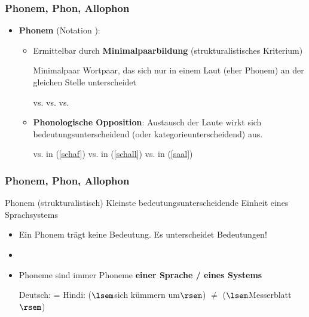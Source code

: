 \begin{frame}
\frametitle{Phonem, Phon, Allophon}

\begin{itemize}
	\item \textbf{Phonem} (Notation \textipa{/ /}):
	
	\begin{itemize}
		\item Ermittelbar durch \textbf{Minimalpaarbildung} (strukturalistisches Kriterium)
		
		\begin{block}{Minimalpaar}
Wortpaar, das sich nur in einem Laut (eher Phonem) an der gleichen Stelle unterscheidet
		\end{block}
	
	\eal
		\ex \label{schaf} \textipa{[Sa:l]}   vs. \textipa{[Sa:f]} 
		\ex\label{schall} \textipa{[Sa:l]}  vs. \textipa{[Sal]} 
		\ex \label{saal} \textipa{[Sa:l]}  vs. \textipa{[za:l]} 
	\zl
	
		\item \textbf{Phonologische Opposition}: Austausch der Laute wirkt sich bedeutungsunterscheidend (oder kategorieunterscheidend) aus.
	
	\eal
		\ex {} vs.  in (\ref{schaf})
		\ex {} vs.  in (\ref{schall})
		\ex {} vs.  in (\ref{saal})
	\zl			
	
	\end{itemize}
	
\end{itemize}

\end{frame}




\begin{frame}
\frametitle{Phonem, Phon, Allophon}

\begin{block}{Phonem (strukturalistisch)}
Kleinste bedeutungsunterscheidende Einheit eines Sprachsystems
\end{block}

\begin{itemize}
	\item Ein Phonem trägt keine Bedeutung. Es unterscheidet Bedeutungen!
	\item[]
	\item Phoneme sind immer Phoneme \textbf{einer Sprache / eines Systems}

	\eal
		\ex Deutsch: \textipa{[papa]} = 
		\ex Hindi: \textipa{[pal]} ($\lsem$sich kümmern um$\rsem$) $\neq$ \textipa{[p\super{h}al]} ($\lsem$Messerblatt$\rsem$)
	\zl

\end{itemize}

\end{frame}



